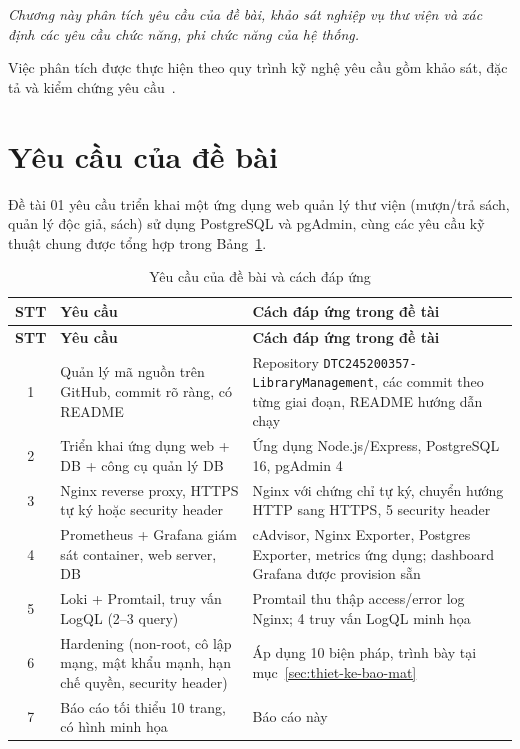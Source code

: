 \documentclass[../main.tex]{subfiles}
\begin{document}
\textit{Chương này phân tích yêu cầu của đề bài, khảo sát nghiệp vụ thư viện và xác định các yêu cầu chức năng, phi chức năng của hệ thống.}

Việc phân tích được thực hiện theo quy trình kỹ nghệ yêu cầu gồm khảo sát, đặc tả và kiểm chứng yêu cầu~\cite{sommerville2016software}.

\section{Yêu cầu của đề bài}
Đề tài 01 yêu cầu triển khai một ứng dụng web quản lý thư viện (mượn/trả sách, quản lý độc giả, sách) sử dụng PostgreSQL và pgAdmin, cùng các yêu cầu kỹ thuật chung được tổng hợp trong Bảng~\ref{tab:yeu-cau-de-bai}.

\begin{longtable}{|c|p{5.2cm}|p{8.3cm}|}
\caption{Yêu cầu của đề bài và cách đáp ứng}
\label{tab:yeu-cau-de-bai}\\
\hline
\textbf{STT} & \textbf{Yêu cầu} & \textbf{Cách đáp ứng trong đề tài} \\
\hline
\endfirsthead
\hline
\textbf{STT} & \textbf{Yêu cầu} & \textbf{Cách đáp ứng trong đề tài} \\
\hline
\endhead
1 & Quản lý mã nguồn trên GitHub, commit rõ ràng, có README & Repository \nolinkurl{DTC245200357-LibraryManagement}, các commit theo từng giai đoạn, README hướng dẫn chạy \\ \hline
2 & Triển khai ứng dụng web + DB + công cụ quản lý DB & Ứng dụng Node.js/Express, PostgreSQL 16, pgAdmin 4 \\ \hline
3 & Nginx reverse proxy, HTTPS tự ký hoặc security header & Nginx với chứng chỉ tự ký, chuyển hướng HTTP sang HTTPS, 5 security header \\ \hline
4 & Prometheus + Grafana giám sát container, web server, DB & cAdvisor, Nginx Exporter, Postgres Exporter, metrics ứng dụng; dashboard Grafana được provision sẵn \\ \hline
5 & Loki + Promtail, truy vấn LogQL (2--3 query) & Promtail thu thập access/error log Nginx; 4 truy vấn LogQL minh họa \\ \hline
6 & Hardening (non-root, cô lập mạng, mật khẩu mạnh, hạn chế quyền, security header) & Áp dụng 10 biện pháp, trình bày tại mục~\ref{sec:thiet-ke-bao-mat} \\ \hline
7 & Báo cáo tối thiểu 10 trang, có hình minh họa & Báo cáo này \\ \hline
\end{longtable}
\end{document}
